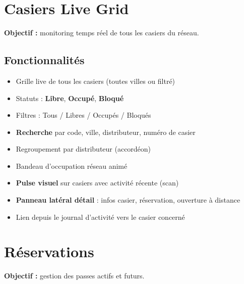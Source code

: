 \documentclass[11pt,a4paper]{article}
\begin{document}
\section{Casiers Live Grid}

\textbf{Objectif :} monitoring temps réel de tous les casiers du réseau.

\subsection{Fonctionnalités}
\begin{itemize}
  \item Grille live de tous les casiers (toutes villes ou filtré)
  \item Statuts : \textbf{Libre}, \textbf{Occupé}, \textbf{Bloqué}
  \item Filtres : Tous / Libres / Occupés / Bloqués
  \item \textbf{Recherche} par code, ville, distributeur, numéro de casier
  \item Regroupement par distributeur (accordéon)
  \item Bandeau d'occupation réseau animé
  \item \textbf{Pulse visuel} sur casiers avec activité récente (scan)
  \item \textbf{Panneau latéral détail} : infos casier, réservation, ouverture à distance
  \item Lien depuis le journal d'activité vers le casier concerné
\end{itemize}

\section{Réservations}

\textbf{Objectif :} gestion des passes actifs et futurs.
\end{document}
